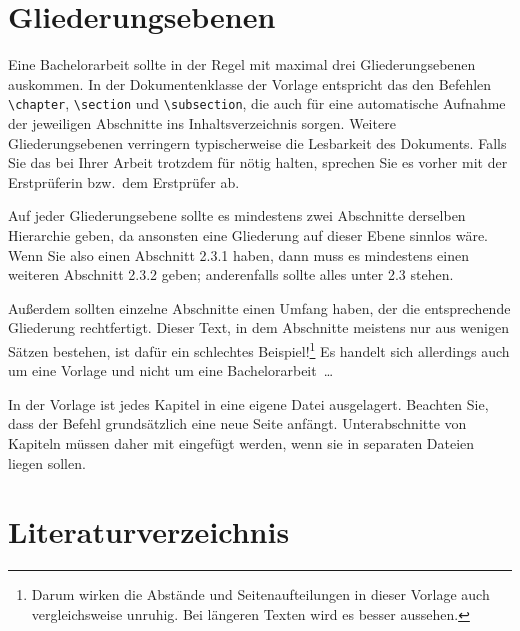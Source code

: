 \section{Gliederungsebenen}

Eine Bachelorarbeit sollte in der Regel mit maximal drei Gliederungsebenen
auskommen.  In der Dokumentenklasse der Vorlage entspricht das den Befehlen
\verb|\chapter|, \verb|\section| und \verb|\subsection|, die auch für eine
automatische Aufnahme der jeweiligen Abschnitte ins Inhaltsverzeichnis sorgen.
Weitere Gliederungsebenen verringern typischerweise die Lesbarkeit des
Dokuments.  Falls Sie das bei Ihrer Arbeit trotzdem für nötig halten, sprechen
Sie es vorher mit der Erstprüferin bzw.\ dem Erstprüfer ab.

Auf jeder Gliederungsebene sollte es mindestens zwei Abschnitte derselben
Hierarchie geben, da ansonsten eine Gliederung auf dieser Ebene sinnlos wäre.
Wenn Sie also einen Abschnitt 2.3.1 haben, dann muss es mindestens einen
weiteren Abschnitt 2.3.2 geben; anderenfalls sollte alles unter 2.3 stehen.

Außerdem sollten einzelne Abschnitte einen Umfang haben, der die entsprechende
Gliederung rechtfertigt.  Dieser Text, in dem Abschnitte meistens nur aus
wenigen Sätzen bestehen, ist dafür ein schlechtes Beispiel!\footnote{Darum
  wirken die Abstände und Seitenaufteilungen in dieser Vorlage auch
  vergleichsweise unruhig.  Bei längeren Texten wird es besser aussehen.} Es
handelt sich allerdings auch um eine Vorlage und nicht um eine
Bachelorarbeit~\dots

In der Vorlage ist jedes Kapitel in eine eigene Datei ausgelagert.  Beachten
Sie, dass der Befehl \verb|| grundsätzlich eine neue Seite anfängt.
Unterabschnitte von Kapiteln müssen daher mit \verb|| eingefügt werden,
wenn sie in separaten Dateien liegen sollen.

\section{Literaturverzeichnis}

